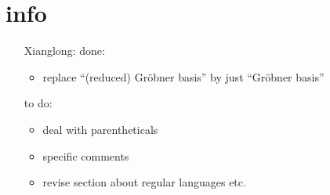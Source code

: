 \section*{info}
\begin{itemize}
	\item[Xianglong:] 
	done:
	\begin{itemize}
		\item replace ``(reduced) Gr\"obner basis'' by just ``Gr\"obner basis''
	\end{itemize}
	to do:
	\begin{itemize}
		\item deal with parentheticals
		\item specific comments
		\item revise section about regular languages etc.
	\end{itemize}
\end{itemize}
\newpage
